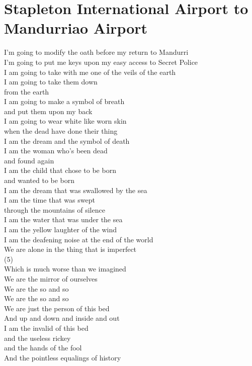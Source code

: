 \documentclass[smalldemyvopaper,11pt,twoside,onecolumn,openright,extrafontsizes]{memoir}
\begin{document}
\chapter{Stapleton International Airport to Mandurriao Airport}
I'm going to modify the oath before my return to Mandurri
\\I'm going to put me keys upon my easy access to Secret Police
\\I am going to take with me one of the veils of the earth
\\I am going to take them down
\\from the earth
\\I am going to make a symbol of breath
\\and put them upon my back
\\I am going to wear white like worn skin
\\when the dead have done their thing
\\I am the dream and the symbol of death
\\I am the woman who's been dead
\\and found again
\\I am the child that chose to be born
\\and wanted to be born
\\I am the dream that was swallowed by the sea
\\I am the time that was swept
\\through the mountains of silence
\\I am the water that was under the sea
\\I am the yellow laughter of the wind
\\I am the deafening noise at the end of the world
\\We are alone in the thing that is imperfect
\\(5)
\\Which is much worse than we imagined
\\We are the mirror of ourselves
\\We are the so and so
\\We are the so and so
\\We are just the person of this bed
\\And up and down and inside and out
\\I am the invalid of this bed
\\and the useless rickey
\\and the hands of the fool
\\And the pointless equalings of history
\end{document}
